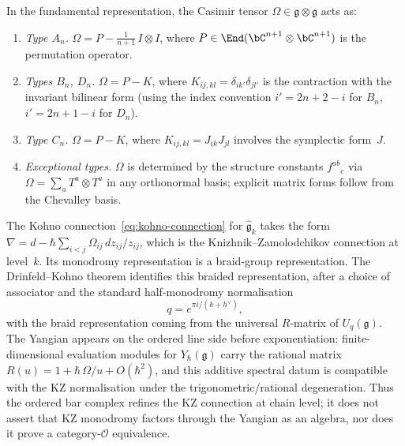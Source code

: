 \begin{remark}
\label{rem:casimir-types}
In the fundamental representation, the Casimir tensor
$\Omega\in\mathfrak{g}\otimes\mathfrak{g}$ acts as:
\begin{enumerate}[label=\textup{(\alph*)}]
\item \emph{Type $A_n$.}\enspace
$\Omega = P - \frac{1}{n+1}\,I\otimes I$,
where $P\in\End(\bC^{n+1}\otimes\bC^{n+1})$ is the
permutation operator.
\item \emph{Types $B_n$, $D_n$.}\enspace
$\Omega = P - K$,
where $K_{ij,kl} = \delta_{ik'}\delta_{jl'}$
is the contraction with the invariant bilinear form
(using the index convention $i' = 2n+2-i$ for $B_n$,
$i' = 2n+1-i$ for $D_n$).
\item \emph{Type $C_n$.}\enspace
$\Omega = P - K$,
where $K_{ij,kl} = J_{ik}J_{jl}$ involves the
symplectic form~$J$.
\item \emph{Exceptional types.}\enspace
$\Omega$ is determined by the structure constants
$f^{ab}{}_{c}$ via
$\Omega = \sum_a T^a\otimes T^a$
in any orthonormal basis; explicit matrix forms
follow from the Chevalley basis.
\end{enumerate}
\end{remark}

\begin{remark}
\label{rem:km-drinfeld-kohno}
The Kohno connection~\eqref{eq:kohno-connection} for
$\widehat{\mathfrak{g}}_k$ takes the form
$\nabla = d - \hbar\sum_{i<j}\Omega_{ij}\,dz_{ij}/z_{ij}$,
which is the Knizhnik--Zamolodchikov connection at level~$k$.
Its monodromy representation is a braid-group representation.
The Drinfeld--Kohno theorem identifies this braided representation,
after a choice of associator and the standard half-monodromy
normalisation
\[
 q=e^{\pi i/(k+h^\vee)},
\]
with the braid representation coming from the universal
$R$-matrix of $U_q(\mathfrak g)$. The Yangian appears on the
ordered line side before exponentiation: finite-dimensional
evaluation modules for $Y_\hbar(\mathfrak g)$ carry the rational
matrix $R(u)=1+\hbar\,\Omega/u+O(\hbar^2)$, and this additive
spectral datum is compatible with the KZ normalisation under the
trigonometric/rational degeneration. Thus the ordered bar complex
refines the KZ connection at chain level; it does not assert that KZ
monodromy factors through the Yangian as an algebra, nor does it
prove a category-$\mathcal O$ equivalence.
\end{remark}

